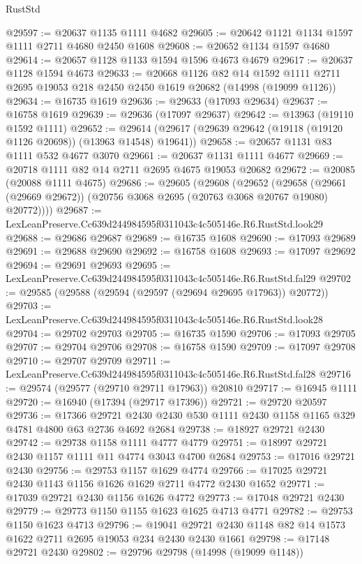 \begin{lexlean}{RustStd}
\begin{coremodule}
@29597 := @20637 @1135 @1111 @4682
@29605 := @20642 @1121 @1134 @1597 @1111 @2711 @4680 @2450 @1608
@29608 := @20652 @1134 @1597 @4680
@29614 := @20657 @1128 @1133 @1594 @1596 @4673 @4679
@29617 := @20637 @1128 @1594 @4673
@29633 := @20668
    @1126
    @82
    @14
    @1592
    @1111
    @2711
    @2695
    @19053
    @218
    @2450
    @2450
    @1619
    @20682
    (@14998 (@19099 @1126))
@29634 := @16735 @1619
@29636 := @29633 (@17093 @29634)
@29637 := @16758 @1619
@29639 := @29636 (@17097 @29637)
@29642 := @13963 (@19110 @1592 @1111)
@29652 := @29614 (@29617 (@29639 @29642 (@19118 (@19120 @1126 @20698)) (@13963 @14548) @19641))
@29658 := @20657 @1131 @83 @1111 @532 @4677 @3070
@29661 := @20637 @1131 @1111 @4677
@29669 := @20718 @1111 @82 @14 @2711 @2695 @4675 @19053 @20682
@29672 := @20085 (@20088 @1111 @4675)
@29686 := @29605
    (@29608
      (@29652
        (@29658 (@29661 (@29669 @29672)) (@20756 @3068 @2695 (@20763 @3068 @20767 @19080) @20772))))
@29687 := LexLeanPreserve.Cc639d244984595f0311043c4c505146e.R6.RustStd.look29
@29688 := @29686 @29687
@29689 := @16735 @1608
@29690 := @17093 @29689
@29691 := @29688 @29690
@29692 := @16758 @1608
@29693 := @17097 @29692
@29694 := @29691 @29693
@29695 := LexLeanPreserve.Cc639d244984595f0311043c4c505146e.R6.RustStd.fal29
@29702 := @29585 (@29588 (@29594 (@29597 (@29694 @29695 @17963)) @20772))
@29703 := LexLeanPreserve.Cc639d244984595f0311043c4c505146e.R6.RustStd.look28
@29704 := @29702 @29703
@29705 := @16735 @1590
@29706 := @17093 @29705
@29707 := @29704 @29706
@29708 := @16758 @1590
@29709 := @17097 @29708
@29710 := @29707 @29709
@29711 := LexLeanPreserve.Cc639d244984595f0311043c4c505146e.R6.RustStd.fal28
@29716 := @29574 (@29577 (@29710 @29711 @17963)) @20810
@29717 := @16945 @1111
@29720 := @16940 (@17394 (@29717 @17396))
@29721 := @29720 @20597
@29736 := @17366
    @29721
    @2430
    @2430
    @530
    @1111
    @2430
    @1158
    @1165
    @329
    @4781
    @4800
    @63
    @2736
    @4692
    @2684
@29738 := @18927 @29721 @2430
@29742 := @29738 @1158 @1111 @4777 @4779
@29751 := @18997 @29721 @2430 @1157 @1111 @11 @4774 @3043 @4700 @2684
@29753 := @17016 @29721 @2430
@29756 := @29753 @1157 @1629 @4774
@29766 := @17025 @29721 @2430 @1143 @1156 @1626 @1629 @2711 @4772 @2430 @1652
@29771 := @17039 @29721 @2430 @1156 @1626 @4772
@29773 := @17048 @29721 @2430
@29779 := @29773 @1150 @1155 @1623 @1625 @4713 @4771
@29782 := @29753 @1150 @1623 @4713
@29796 := @19041 @29721 @2430 @1148 @82 @14 @1573 @1622 @2711 @2695 @19053 @234 @2430 @2430 @1661
@29798 := @17148 @29721 @2430
@29802 := @29796 @29798 (@14998 (@19099 @1148))

\end{coremodule}
\end{lexlean}
